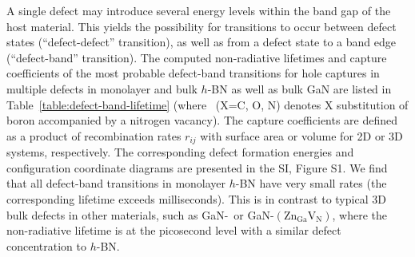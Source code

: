 A single defect may introduce several energy levels within the band gap of the host material. This yields the possibility for transitions to occur between defect states (``defect-defect'' transition), as well as from a defect state to a band edge (``defect-band'' transition). The computed non-radiative lifetimes and capture coefficients of the most probable defect-band transitions for hole captures in multiple defects in monolayer and bulk $h$-BN as well as bulk GaN are listed in Table~\ref{table:defect-band-lifetime} (where \XBVN\ (X=C, O, N) denotes X substitution of boron accompanied by a nitrogen vacancy). The capture coefficients are defined as a product of recombination rates $r_{ij}$ with surface area or volume for 2D or 3D systems, respectively. The corresponding defect formation energies and configuration coordinate diagrams are presented in the SI, Figure S1.
We find that all defect-band transitions in monolayer $h$-BN have very small rates (the corresponding lifetime exceeds milliseconds). This is in contrast to typical 3D bulk defects in other materials, such as GaN-\CN\ or GaN-$(\mathrm{Zn_{Ga}V_N})$, where the non-radiative lifetime is at the picosecond level with a similar defect concentration to $h$-BN.~\cite{shi2012ab,alkauskas2014first2,Reshchikov2014}

